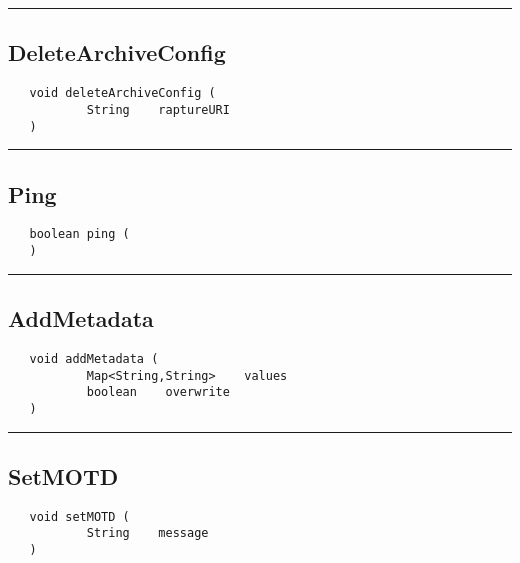 \rule{15cm}{2pt}
\subsection{DeleteArchiveConfig}
\label{Api:DeleteArchiveConfig}
\begin{verbatim}
   void deleteArchiveConfig (
           String    raptureURI
   )
\end{verbatim}



\rule{15cm}{2pt}
\subsection{Ping}
\label{Api:Ping}
\begin{verbatim}
   boolean ping (
   )
\end{verbatim}



\rule{15cm}{2pt}
\subsection{AddMetadata}
\label{Api:AddMetadata}
\begin{verbatim}
   void addMetadata (
           Map<String,String>    values
           boolean    overwrite
   )
\end{verbatim}



\rule{15cm}{2pt}
\subsection{SetMOTD}
\label{Api:SetMOTD}
\begin{verbatim}
   void setMOTD (
           String    message
   )
\end{verbatim}



